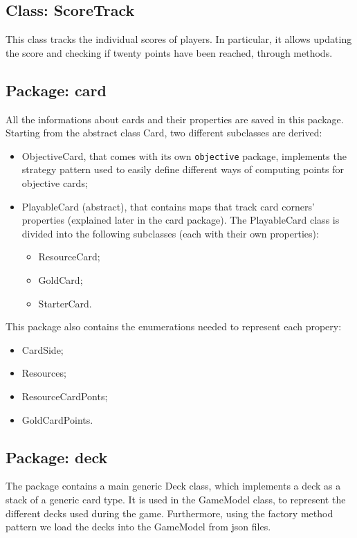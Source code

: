 \documentclass{article}
\begin{document}
\subsection{Class: ScoreTrack}
This class tracks the individual scores of players.
In particular, it allows updating the score and checking if twenty points have been reached, through methods.

\newpage
\subsection{Package: card}
All the informations about cards and their properties are saved in this package.
Starting from the abstract class Card, two different subclasses are derived:
\begin{itemize}
    \item ObjectiveCard, that comes with its own \texttt{objective} package, implements the strategy pattern used to easily define different ways of computing points for objective cards;
    \item PlayableCard (abstract), that contains maps that track card corners' properties (explained later in the card package). \newline
    The PlayableCard class is divided into the following subclasses (each with their own properties): 
    \begin{itemize}
        \item ResourceCard;
        \item GoldCard;
        \item StarterCard.
    \end{itemize}
\end{itemize}
This package also contains the enumerations needed to represent each propery:
\begin{itemize}
    \item CardSide;
    \item Resources;
    \item ResourceCardPonts;
    \item GoldCardPoints.
\end{itemize}
\noindent

\subsection{Package: deck}
The package contains a main generic Deck class, which implements a deck as a stack of a generic card type.
It is used in the GameModel class, to represent the different decks used during the game. \newline
Furthermore, using the factory method pattern we load the decks into the GameModel from json files.
\end{document}
